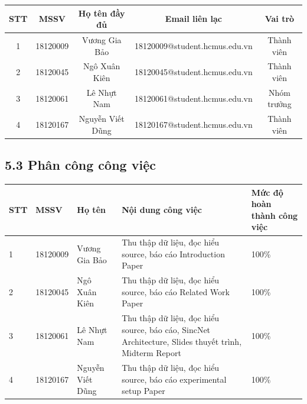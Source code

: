 \documentclass{article}
\newcommand\T{\rule{0pt}{2.6ex}}       %
\newcommand\B{\rule[-1.2ex]{0pt}{0pt}} %
\begin{document}
	\begin{center}
		\begin{tabular}{ | c | c | c | c | c |}\hline
			STT	& MSSV & Họ tên đầy đủ & Email liên lạc & Vai trò\T\B\\\hline
			1 & 18120009 & Vương Gia Bảo & 18120009@student.hcmus.edu.vn  & Thành viên \T\B\\ \hline
			2 & 18120045 & Ngô Xuân Kiên & 18120045@student.hcmus.edu.vn & Thành viên\T\B\\ \hline
			3 & 18120061 & Lê Nhựt Nam & 18120061@student.hcmus.edu.vn & Nhóm trưởng \T\B\\ \hline
			4 & 18120167 & Nguyễn Viết Dũng &  18120167@student.hcmus.edu.vn & Thành viên \T\B\\ \hline
		\end{tabular}
	\end{center}

	\subsection{5.3 Phân công công việc}
	\begin{center}
		\begin{tabular}{ | l | l | l | p{5cm} | p{3cm} |}
			\hline
			STT & MSSV & Họ tên & Nội dung công việc & Mức độ hoàn thành công việc  \T\B\\ \hline
			1 & 18120009 & Vương Gia Bảo & Thu thập dữ liệu, đọc hiểu source, báo cáo Introduction Paper &  100\%\T\B\\ \hline
			2 & 18120045 & Ngô Xuân Kiên & Thu thập dữ liệu, đọc hiểu source, báo cáo Related Work Paper & 100\%\T\B \\ \hline
			3 & 18120061 & Lê Nhựt Nam & Thu thập dữ liệu, đọc hiểu source, báo cáo, SincNet Architecture, Slides thuyết trình, Midterm Report & 100\%\T\B \\ \hline
			4 & 18120167 & Nguyễn Viết Dũng &  Thu thập dữ liệu, đọc hiểu source, báo cáo experimental setup Paper & 100\%\T\B \\ \hline
		\end{tabular}
	\end{center}
	\nocite{*}
	\newpage\cleardoublepage
	
	
\end{document}
